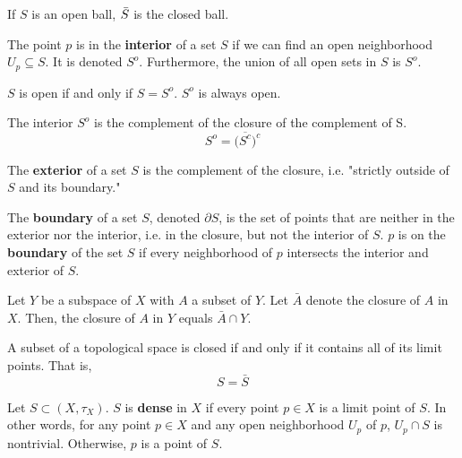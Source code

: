 \documentclass{article}
\begin{document}
    \begin{example}
    If $S$ is an open ball, $\Bar{S}$ is the closed ball. 
    \end{example}

    \begin{definition}
    The point $p$ is in the \textbf{interior} of a set $S$ if we can find an open neighborhood $U_p \subseteq S$. It is denoted $S^{o}$. Furthermore, the union of all open sets in $S$ is $S^{o}$. 
    \end{definition}

    \begin{proposition}
    $S$ is open if and only if $S = S^{o}$. $S^{o}$ is always open.
    \end{proposition}

    \begin{theorem}
    The interior $S^{o}$ is the complement of the closure of the complement of S. \[ S^{o} = \big(\overline{S^{c}}\big)^{c}\]
    \end{theorem}

    \begin{definition}
    The \textbf{exterior} of a set $S$ is the complement of the closure, i.e. "strictly outside of $S$ and its boundary."
    \end{definition}

    \begin{definition}
    The \textbf{boundary} of a set $S$, denoted $\partial S$, is the set of points that are neither in the exterior nor the interior, i.e. in the closure, but not the interior of $S$. $p$ is on the \textbf{boundary} of the set $S$ if every neighborhood of $p$ intersects the interior and exterior of $S$.  
    \end{definition}

    \begin{theorem}
    Let $Y$ be a subspace of $X$ with $A$ a subset of $Y$. Let $\bar{A}$ denote the closure of $A$ in $X$. Then, the closure of $A$ in $Y$ equals $\bar{A} \cap Y$. 
    \end{theorem}

    \begin{theorem}
    A subset of a topological space is closed if and only if it contains all of its limit points. That is, 
    \[S = \bar{S}\]
    \end{theorem}

    \begin{definition}
    Let $S \subset (X, \tau_X)$. $S$ is \textbf{dense} in $X$ if every point $p \in X$ is a limit point of $S$. In other words, for any point $p \in X$ and any open neighborhood $U_p$ of $p$, $U_p \cap S$ is nontrivial. Otherwise, $p$ is a point of $S$. 
    \end{definition}
\end{document}
